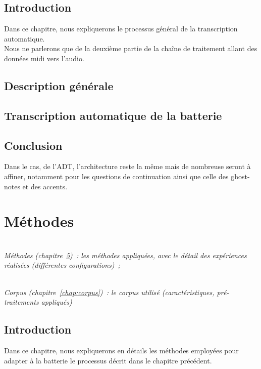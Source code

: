 \documentclass[a4paper,11pt,twoside]{memoir}
\begin{document}
\section{Introduction}
Dans ce chapitre, nous expliquerons le processus général de la transcription automatique.\\
Nous ne parlerons que de la deuxième partie de la chaîne de traitement allant des données midi vers l’audio.

\section{Description générale}


\section{Transcription automatique de la batterie}



\section{Conclusion}
Dans le cas, de l’ADT, l’architecture reste la même mais de nombreuse seront à affiner, notamment pour les questions de continuation ainsi que celle des ghost-notes et des accents.



\chapter{Méthodes}
\label{chap:methodes}
\minitoc

\textit{\\Méthodes (chapitre~\ref{chap:methodes})~: les méthodes
appliquées, avec le détail des expériences réalisées (différentes
configurations)~;}

\textit{\\Corpus (chapitre~\ref{chap:corpus})~: le corpus utilisé
	\emph{(caractéristiques, pré-traitements appliqués)}}

\section{Introduction}
Dans ce chapitre, nous expliquerons en détails les méthodes employées pour adapter à la batterie le processus décrit dans le chapitre précédent.
\newpage
\end{document}
